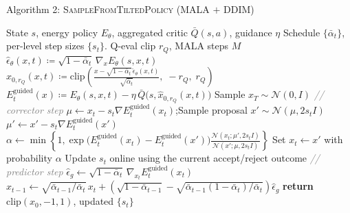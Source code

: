 \documentclass[aspectratio=169,11pt]{beamer}
\begin{document}
\begin{frame}{Algorithm 2: \textsc{SampleFromTiltedPolicy} (MALA $+$ DDIM)}
\small
\begin{fitcenter}
\begin{algorithmic}[1]
\REQUIRE State $s$, energy policy $E_\theta$, aggregated critic $\bar Q(s,a)$, guidance $\eta$
\REQUIRE Schedule $\{\bar\alpha_t\}$, per-level step sizes $\{s_t\}$.
\REQUIRE Q-eval clip $r_Q$, MALA steps $M$
\STATE $\hat\epsilon_\theta(x,t)\coloneqq\sqrt{1{-}\bar\alpha_t}\,\nabla_x E_\theta(s,x,t)$
\STATE $\hat x_{0,r_Q}(x,t)\coloneqq \mathrm{clip}\!\left(\tfrac{x-\sqrt{1{-}\bar\alpha_t}\,\hat\epsilon_\theta(x,t)}{\sqrt{\bar\alpha_t}},\;{-}r_Q,\;r_Q\right)$
\STATE $E_t^{\mathrm{guided}}(x)\coloneqq E_\theta(s,x,t)-\eta\,\bar Q\bigl(s,\hat x_{0,r_Q}(x,t)\bigr)$
\STATE Sample $x_T\sim\mathcal{N}(0,I)$
  \STATE \textcolor{gray}{\textit{// corrector step}}
    \STATE $\mu\leftarrow x_t-s_t\nabla E_t^{\mathrm{guided}}(x_t)$;\quad Sample proposal $x'\sim\mathcal{N}(\mu,2s_tI)$ 
    \STATE $\mu'\leftarrow x'-s_t\nabla E_t^{\mathrm{guided}}(x')$ 
    \STATE $\alpha\leftarrow\min\!\left\{1,\exp\!\bigl(E_t^{\mathrm{guided}}(x_t)-E_t^{\mathrm{guided}}(x')\bigr)\tfrac{\mathcal{N}(x_t;\mu',2s_tI)}{\mathcal{N}(x';\mu,2s_tI)}\right\}$ 
    \STATE Set $x_t\leftarrow x'$  with probability $\alpha$ 
    \STATE Update $s_t$ online using the current accept/reject outcome 
  \ENDFOR
  \STATE \textcolor{gray}{\textit{// predictor step}}
  \STATE $\hat\epsilon_g\leftarrow\sqrt{1{-}\bar\alpha_t}\,\nabla_{x_t}E_t^{\mathrm{guided}}(x_t)$
  \STATE $x_{t-1}\leftarrow\sqrt{\bar\alpha_{t-1}/\bar\alpha_t}\,x_t + \left(\sqrt{1{-}\bar\alpha_{t-1}}-\sqrt{\bar\alpha_{t-1}(1{-}\bar\alpha_t)/\bar\alpha_t}\right)\hat\epsilon_g$ 
\ENDFOR
\STATE \textbf{return} $\mathrm{clip}(x_0,{-}1,1)$, updated $\{s_t\}$
\end{algorithmic}
\end{fitcenter}
\end{frame}
\end{document}
